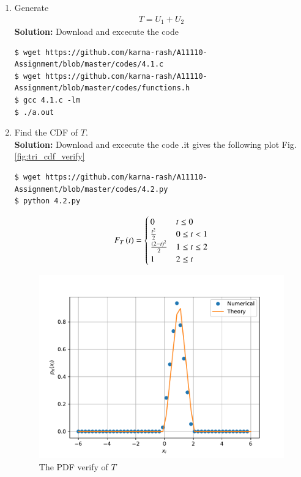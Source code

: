 \documentclass[journal,12pt,twocolumn]{IEEEtran}
\renewcommand\thesection{\arabic{section}}
\begin{document}
\begin{enumerate}[label=\thesection.\arabic*
,ref=\thesection.\theenumi]
%
\item Generate 
	\begin{align}
		T = U_1+U_2
	\end{align}
	\textbf{Solution:}
	Download and excecute the code
	\begin{lstlisting}
$ wget https://github.com/karna-rash/A11110-Assignment/blob/master/codes/4.1.c
$ wget https://github.com/karna-rash/A11110-Assignment/blob/master/codes/functions.h
$ gcc 4.1.c -lm 
$ ./a.out 
	\end{lstlisting}
\item Find the CDF of $T$.\\
\textbf{Solution:}
Download and excecute the code .it gives the following plot Fig.\ref{fig:tri_cdf_verify}
\begin{lstlisting}
$ wget https://github.com/karna-rash/A11110-Assignment/blob/master/codes/4.2.py
$ python 4.2.py
	\end{lstlisting}
	\begin{equation}
F_T\left(t\right)=\begin{cases}
0 & t \le 0 \\
\frac{t^2}{2} & 0 \le t <1 \\
\frac{\left(2-t\right)^2}{2} & 1\le t \le2 \\
1 & 2 \le t
\end{cases}
\end{equation}
	\begin{figure}
\centering
\includegraphics[width=\columnwidth]{./figs/tri_pdf_verify}
\caption{The PDF verify of $T$}

\end{figure}
\end{enumerate}
\end{document}
